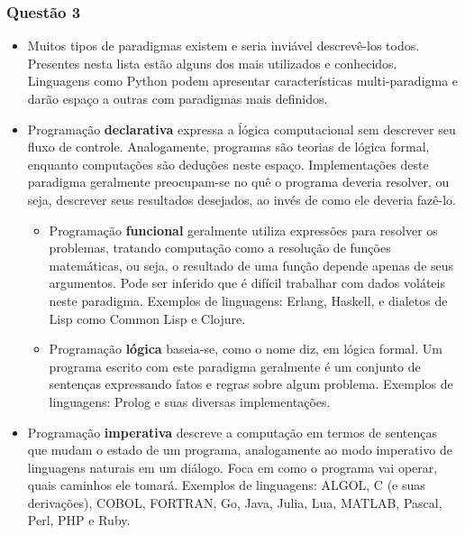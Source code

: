 \documentclass{article}
\begin{document}
\subsubsection*{Questão 3}
\begin{itemize}
    \item Muitos tipos de paradigmas existem e seria inviável descrevê-los
    todos. Presentes nesta lista estão alguns dos mais utilizados e conhecidos.
    Linguagens como Python podem apresentar características multi-paradigma e
    darão espaço a outras com paradigmas mais definidos.

    \item Programação \textbf{declarativa} expressa a ĺógica computacional sem
    descrever seu fluxo de controle. Analogamente, programas são teorias de
    lógica formal, enquanto computações são deduções neste espaço.
    Implementações deste paradigma geralmente preocupam-se no quê o programa
    deveria resolver, ou seja, descrever seus resultados desejados, ao invés de
    como ele deveria fazê-lo.

    \begin{itemize}
        \item Programação \textbf{funcional} geralmente utiliza expressões para
        resolver os problemas, tratando computação como a resolução de funções
        matemáticas, ou seja, o resultado de uma função depende apenas de seus
        argumentos. Pode ser inferido que é difícil trabalhar com dados voláteis
        neste paradigma. Exemplos de linguagens: Erlang, Haskell, e dialetos de
        Lisp como Common Lisp e Clojure.

        \item Programação \textbf{lógica} baseia-se, como o nome diz, em lógica
        formal. Um programa escrito com este paradigma geralmente é um conjunto
        de sentenças expressando fatos e regras sobre algum problema. Exemplos
        de linguagens: Prolog e suas diversas implementações.
    \end{itemize}

    \item Programação \textbf{imperativa} descreve a computação em termos de
    sentenças que mudam o estado de um programa, analogamente ao modo imperativo
    de linguagens naturais em um diálogo. Foca em como o programa vai operar,
    quais caminhos ele tomará. Exemplos de linguagens: ALGOL, C (e suas
    derivações), COBOL, FORTRAN, Go, Java, Julia, Lua, MATLAB, Pascal, Perl,
    PHP e Ruby.


\end{itemize}
\end{document}
